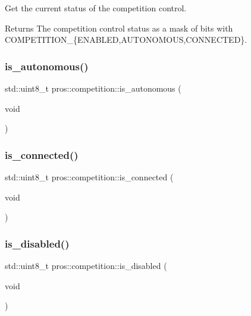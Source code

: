 Get the current status of the competition control. 

\begin{DoxyReturn}{Returns}
The competition control status as a mask of bits with C\+O\+M\+P\+E\+T\+I\+T\+I\+O\+N\+\_\+\{E\+N\+A\+B\+L\+ED,A\+U\+T\+O\+N\+O\+M\+O\+US,C\+O\+N\+N\+E\+C\+T\+ED\}. 
\end{DoxyReturn}
\mbox{\label{namespacepros_1_1competition_a88353a4f8e5e283558ee6504c54283af}} 
\subsubsection{\texorpdfstring{is\+\_\+autonomous()}{is\_autonomous()}}
{\footnotesize\ttfamily std\+::uint8\+\_\+t pros\+::competition\+::is\+\_\+autonomous (\begin{DoxyParamCaption}\item[{void}]{ }\end{DoxyParamCaption})}

\mbox{\label{namespacepros_1_1competition_aaf36367a2369390657f6bc4285f68c64}} 
\subsubsection{\texorpdfstring{is\+\_\+connected()}{is\_connected()}}
{\footnotesize\ttfamily std\+::uint8\+\_\+t pros\+::competition\+::is\+\_\+connected (\begin{DoxyParamCaption}\item[{void}]{ }\end{DoxyParamCaption})}

\mbox{\label{namespacepros_1_1competition_a2d4f4555af4c45f7f82ea75e1223899b}} 
\subsubsection{\texorpdfstring{is\+\_\+disabled()}{is\_disabled()}}
{\footnotesize\ttfamily std\+::uint8\+\_\+t pros\+::competition\+::is\+\_\+disabled (\begin{DoxyParamCaption}\item[{void}]{ }\end{DoxyParamCaption})}

